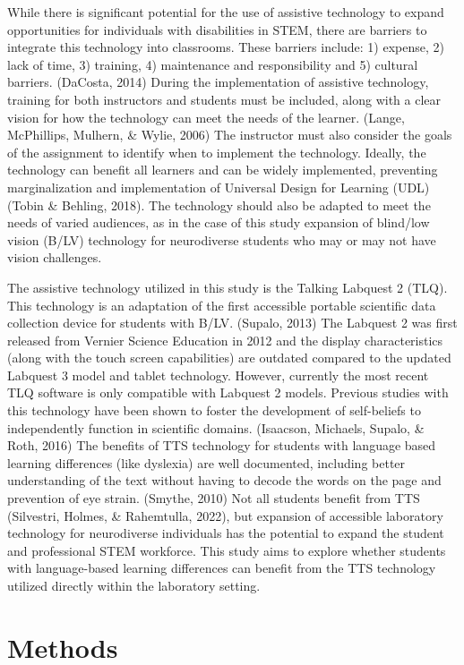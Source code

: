 \documentclass[11.5pt]{sig-alternate}
\begin{document}
\begin{large}
While there is significant potential for the use of assistive technology to expand opportunities for individuals with disabilities in STEM, there are barriers to integrate this technology into classrooms.  These barriers include: 1) expense, 2) lack of time, 3) training, 4) maintenance and responsibility and 5) cultural barriers. (DaCosta, 2014)  During the implementation of assistive technology, training for both instructors and students must be included, along with a clear vision for how the technology can meet the needs of the learner. (Lange, McPhillips, Mulhern, \& Wylie, 2006)  The instructor must also consider the goals of the assignment to identify when to implement the technology.  Ideally, the technology can benefit all learners and can be widely implemented, preventing marginalization and implementation of Universal Design for Learning (UDL) (Tobin \& Behling, 2018).   The technology should also be adapted to meet the needs of varied audiences, as in the case of this study expansion of blind/low vision (B/LV) technology for neurodiverse students who may or may not have vision challenges.

The assistive technology utilized in this study is the Talking Labquest 2 (TLQ).  This technology is an adaptation of the first accessible portable scientific data collection device for students with B/LV. (Supalo, 2013)  The Labquest 2 was first released from Vernier Science Education in 2012 and the display characteristics (along with the touch screen capabilities) are outdated compared to the updated Labquest 3 model and tablet technology.  However, currently the most recent TLQ software is only compatible with Labquest 2 models.  Previous studies with this technology have been shown to foster the development of self-beliefs to independently function in scientific domains. (Isaacson, Michaels, Supalo, \& Roth, 2016)  The benefits of TTS technology for students with language based learning differences (like dyslexia) are well documented, including better  understanding of the text without having to decode the words on the page and prevention of eye strain. (Smythe, 2010)  Not all students benefit from TTS (Silvestri, Holmes, \& Rahemtulla, 2022), but expansion of accessible laboratory technology for neurodiverse individuals has the potential to expand the student and professional STEM workforce.  This study aims to explore whether students with language-based learning differences can benefit from the TTS technology utilized directly within the laboratory setting.

\section*{Methods}

\end{large}
\end{document}
